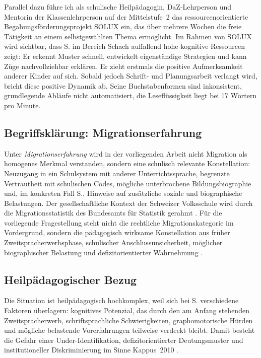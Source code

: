 \documentclass[ngerman, a4paper]{article}
\begin{document}
Parallel dazu führe ich als schulische Heilpädagogin, DaZ-Lehrperson und Mentorin der
Klassenlehrperson auf der Mittelstufe~2 das ressourcenorientierte Begabungsförderungsprojekt
SOLUX ein, das über mehrere Wochen die freie Tätigkeit an einem selbstgewählten Thema
ermöglicht. Im Rahmen von SOLUX wird sichtbar, dass S. im Bereich Schach auffallend
hohe kognitive Ressourcen zeigt: Er erkennt Muster schnell, entwickelt eigenständige
Strategien und kann Züge nachvollziehbar erklären. Er zieht erstmals die positive
Aufmerksamkeit anderer Kinder auf sich. Sobald jedoch Schrift- und Planungsarbeit
verlangt wird, bricht diese positive Dynamik ab. Seine Buchstabenformen sind inkonsistent,
grundlegende Abläufe nicht automatisiert, die Leseflüssigkeit liegt bei 17 Wörtern pro Minute.

\subsection*{Begriffsklärung: Migrationserfahrung}

Unter \textit{Migrationserfahrung} wird in der vorliegenden Arbeit nicht
Migration als homogenes Merkmal verstanden, sondern eine schulisch relevante
Konstellation: Neuzugang in ein Schulsystem mit anderer Unterrichtssprache,
begrenzte Vertrautheit mit schulischen Codes, mögliche unterbrochene
Bildungsbiographie und, im konkreten Fall S., Hinweise auf zusätzliche
soziale und biographische Belastungen. Der gesellschaftliche Kontext der
Schweizer Volksschule wird durch die Migrationsstatistik des Bundesamts
für Statistik gerahmt \parencite[S.\,3,\,5]{bfs2022migration}. Für die vorliegende
Fragestellung steht nicht die rechtliche Migrationskategorie im Vordergrund,
sondern die pädagogisch wirksame Konstellation aus früher
Zweitspracherwerbsphase, schulischer Anschlussunsicherheit, möglicher
biographischer Belastung und defizitorientierter Wahrnehmung
\parencites[S.\,86,\,88,\,92,\,95--97]{behrensen2019inklusive}[S.\,576--585]{stamm2021fehlenderblick}.

\subsection*{Heilpädagogischer Bezug}
 
Die Situation ist heilpädagogisch hochkomplex, weil sich bei S. verschiedene Faktoren
überlagern: kognitives Potenzial, das durch den am Anfang stehenden Zweitspracherwerb,
schriftsprachliche Schwierigkeiten, graphomotorische Hürden und mögliche belastende
Vorerfahrungen teilweise verdeckt bleibt. Damit besteht die Gefahr einer
Under-Identifikation, defizitorientierter Deutungsmuster und institutioneller
Diskriminierung im Sinne Kappus~2010
\parencite[S.\,63--77]{kappus2010migration}.
\end{document}
